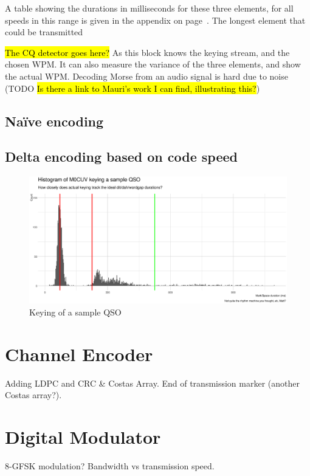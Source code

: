 \documentclass[a4paper]{tufte-handout}
\begin{document}
A table showing the durations in milliseconds for these three elements, for all speeds in this range is given in the appendix on page~\pageref{tab:morsetab}. The longest element that could be transmitted 

\hl{The CQ detector goes here?} As this block knows the keying stream, and the chosen WPM. It can also measure the variance of the three elements, and show the actual WPM. Decoding Morse from an audio signal is hard due to noise (TODO \hl{Is there a link to Mauri's work I can find, illustrating this?})


\subsection{Naïve encoding}



\subsection{Delta encoding based on code speed}
\label{section:delta-encoding}


    \begin{figure}[h]
        \includegraphics[width=\linewidth]{sample-qso-m0cuv}
        \caption{Keying of a sample QSO}
        \label{fig:sampleqso}
    \end{figure}


\section{Channel Encoder}
Adding LDPC and CRC \& Costas Array. End of transmission marker (another Costas array?).

\section{Digital Modulator}
8-GFSK modulation? Bandwidth vs transmission speed.
\end{document}
